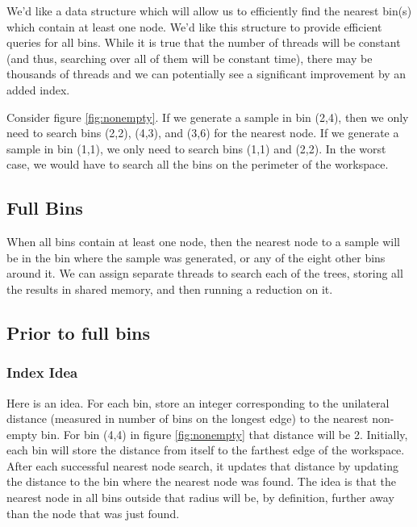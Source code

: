 \begin{figure}[h]
\begin{centering}
    \texttt{[image: \\figfile\{fig/nonempty\_search]}}
    \caption{Non-empty Search}
    \label{fig:nonempty}
\end{centering}
\end{figure}


We'd like a data structure which will allow us to efficiently find the nearest bin(s) which contain at least one node. We'd like this structure to provide efficient queries for all bins. While it is true that the number of threads will be constant (and thus, searching over all of them will be constant time), there may be thousands of threads and we can potentially see a significant improvement by an added index. 

Consider figure \ref{fig:nonempty}. If we generate a sample in bin (2,4), then we only need to search bins (2,2), (4,3), and (3,6) for the nearest node. If we generate a sample in bin (1,1), we only need to search bins (1,1) and (2,2). In the worst case, we would have to search all the bins on the perimeter of the workspace. 

\subsection{Full Bins}

When all bins contain at least one node, then the nearest node to a sample will be in the bin where the sample was generated, or any of the eight other bins around it. We can assign separate threads to search each of the trees, storing all the results in shared memory, and then running a reduction on it. 

\subsection{Prior to full bins}

\subsubsection{Index Idea}

Here is an idea. For each bin, store an integer corresponding to the unilateral distance (measured in number of bins on the longest edge) to the nearest non-empty bin. For bin (4,4) in figure \ref{fig:nonempty} that distance will be 2. Initially, each bin will store the distance from itself to the farthest edge of the workspace. After each successful nearest node search, it updates that distance by updating the distance to the bin where the nearest node was found. The idea is that the nearest node in all bins outside that radius will be, by definition, further away than the node that was just found. 


